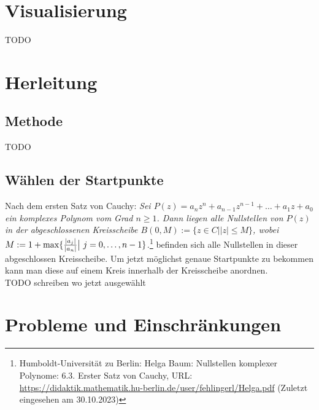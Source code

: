 \documentclass[12pt]{article}
\begin{document}
\section{Visualisierung}
TODO


\section{Herleitung}
\subsection{Methode}
TODO

\subsection{Wählen der Startpunkte}
Nach dem ersten Satz von Cauchy: \glqq\textit{Sei $P(z) = a_nz^n+a_{n-1}z^{n-1}+\dots+a_1z+a_0$ ein komplexes Polynom vom Grad $n \ge 1$. Dann liegen alle Nullstellen von $P(z)$ in der abgeschlossenen Kreisscheibe $B(0,M) := \{z \in C \bigr| |z| \le M\}$, wobei $M := 1 + \max\{\frac{|a_j|}{|a_n|}\bigr|\text{\space}j=0,\dots,n-1\}$.}\grqq\footnote{Humboldt-Universität zu Berlin: Helga Baum: Nullstellen komplexer Polynome: 6.3. Erster Satz von Cauchy, URL: \url{https://didaktik.mathematik.hu-berlin.de/user/fehlingerl/Helga.pdf} (Zuletzt eingesehen am 30.10.2023)} befinden sich alle Nullstellen in dieser abgeschlossen Kreisscheibe. Um jetzt möglichst genaue Startpunkte zu bekommen kann man diese auf einem Kreis innerhalb der Kreisscheibe anordnen. \\
TODO schreiben wo jetzt ausgewählt


\section{Probleme und Einschränkungen}
\end{document}

